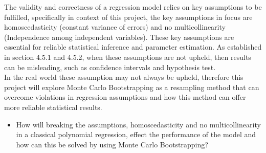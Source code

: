 The validity and correctness of a regression model relies on key assumptions to be fulfilled, specifically in context of this project, the key assumptions in focus are homoscedasticity (constant variance of errors) and no multicollinearity (Independence among independent variables). These key assumptions are essential for reliable statistical inference and parameter estimation. As established in section 4.5.1 and 4.5.2, when these assumptions are not upheld, then results can be misleading, such as confidence intervals and hypothesis test.\\
In the real world these assumption may not always be upheld, therefore this project will explore Monte Carlo Bootstrapping as a resampling method that can overcome violations in regression assumptions and how this method can offer more reliable statistical results.  


\begin{itemize}
	\item How will breaking the assumptions, homoscedasticity and no multicollinearity in a classical polynomial regression, effect the performance of the model and how can this be solved by using Monte Carlo Bootstrapping?
\end{itemize}
